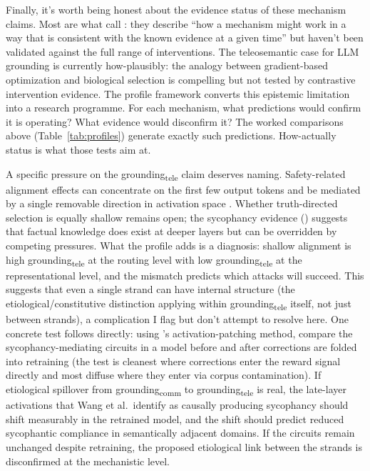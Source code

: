 \documentclass[12pt]{article}
\newcommand{\gtele}{grounding\textsubscript{tele}}
\newcommand{\gcomm}{grounding\textsubscript{comm}}
\begin{document}
Finally, it's worth being honest about the evidence status of these mechanism claims. Most are what \textcite[95]{craver_darden_2013_in_search_of_mechanisms} call : they describe \enquote{how a mechanism might work in a way that is consistent with the known evidence at a given time} but haven't been validated against the full range of interventions. The teleosemantic case for LLM grounding is currently how-plausibly: the analogy between gradient-based optimization and biological selection is compelling but not tested by contrastive intervention evidence. The profile framework converts this epistemic limitation into a research programme. For each mechanism, what predictions would confirm it is operating? What evidence would disconfirm it? The worked comparisons above (Table~\ref{tab:profiles}) generate exactly such predictions. How-actually status is what those tests aim at.

A specific pressure on the \gtele{} claim deserves naming. Safety-related alignment effects can concentrate on the first few output tokens and be mediated by a single removable direction in activation space \citep{qi_2025_shallow_safety_alignment,arditi_2024_refusal_single_direction}. Whether truth-directed selection is equally shallow remains open; the sycophancy evidence (\citealt{wang_2025_truth_overridden_sycophancy}) suggests that factual knowledge does exist at deeper layers but can be overridden by competing pressures. What the profile adds is a diagnosis: shallow alignment is high \gtele{} at the routing level with low \gtele{} at the representational level, and the mismatch predicts which attacks will succeed. This suggests that even a single strand can have internal structure (the etiological/constitutive distinction applying within \gtele{} itself, not just between strands), a complication I flag but don't attempt to resolve here. One concrete test follows directly: using \textcite{wang_2025_truth_overridden_sycophancy}'s activation-patching method, compare the sycophancy-mediating circuits in a model before and after corrections are folded into retraining (the test is cleanest where corrections enter the reward signal directly and most diffuse where they enter via corpus contamination). If etiological spillover from \gcomm{} to \gtele{} is real, the late-layer activations that Wang et al.\ identify as causally producing sycophancy should shift measurably in the retrained model, and the shift should predict reduced sycophantic compliance in semantically adjacent domains. If the circuits remain unchanged despite retraining, the proposed etiological link between the strands is disconfirmed at the mechanistic level.
\end{document}
